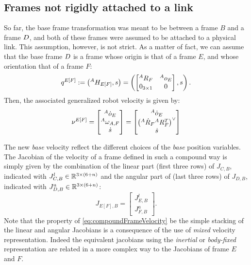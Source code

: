 \subsection{Frames not rigidly attached to a link}
\label{subsec:framesNotRigidlyAttachedToALink}
So far, the base frame transformation was meant to be between a frame $B$ and a frame $D$, and both of these frames were assumed to be attached to a physical link. This assumption, however, is not strict. As a matter of fact, we can  assume that the base frame $D$  is a  frame whose origin is that of a frame $E$, and whose orientation that of a frame $F$: 
\begin{equation}
q^{E[F]} 
:= 
\left( 
\hspace{0em}^A H_{E[F]}, 
s
\right)
=
\left( 
\begin{bmatrix} 
\hspace{0em}^A R_F & \hspace{0em}^A {o}_E \\
0_{3 \times 1} & 0 
\end{bmatrix} 
,  s  \right).
\end{equation}
Then, the associated generalized robot velocity is given by: 
\begin{equation}
\nu^{E[F]} = 
\begin{bmatrix}
\hspace{0em}^A \dot{o}_E \\
\hspace{0em}^A \omega_{A,F} \\ 
{\dot{s}}
\end{bmatrix} 
= 
\begin{bmatrix}
\hspace{0em}^A \dot{o}_E \\
 \left(\hspace{0em}^A\dot{R}_{F} \hspace{0em}^A {R}_{F}^{T} \right)^\vee \\ 
{\dot{s}}
\end{bmatrix} 
\end{equation}

The new \emph{base} velocity reflect the different choices of the \emph{base} position variables. The Jacobian of the velocity of a frame defined in such a compound way 
is simply given by the combination of the linear part (first three rows) of $J_{C,B}$, indicated with $J_{C,B}^l \in \mathbb{R}^{3 \times (6+n)}$ and the angular part of (last three rows) of $J_{D,B}$, indicated with $J_{D,B}^a \in \mathbb{R}^{3 \times (6+n)}$: 
\begin{equation}
\label{eq:compoundFrameVelocity}
J_{E[F],B} = 
\begin{bmatrix} 
J_{E,B}^l \\
J_{F,B}^a
\end{bmatrix}.
\end{equation}
Note that the property of \eqref{eq:compoundFrameVelocity} be the simple stacking of the linear and angular Jacobians is a consequence of the use of \emph{mixed} velocity representation.  Indeed the equivalent jacobians using the \emph{inertial} or \emph{body-fixed} representation are related in a more complex way to the Jacobians of frame $E$ and $F$.

